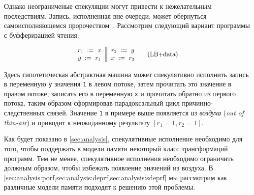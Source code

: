 Однако неограниченые спекуляции могут привести 
к нежелательным последствиям. 
Запись, исполненная вне очереди, может обернуться
самоисполняющемся пророчеством~\cite{Boehm-Demsky:MSPC14}. 
Рассмотрим следующий вариант программы с буфферизацией чтения:

\begin{equation*}
\small
\inarrII{
  \readInst{}{r_1}{x}   \\
  \writeInst{}{y}{r_1}  \\
}{
  \readInst{}{r_2}{y}   \\
  \writeInst{}{x}{r_2}  \\
}
\tag{LB+data}\label{ex:lb+data}
\end{equation*}

Здесь гипотетическая абстрактная машина 
может спекулятивно исполнить запись в переменную \texttt{y}
значения \texttt{1} в левом потоке, 
затем прочитать это значение в правом потоке, 
записать его в переменную \texttt{x} и прочитать обратно из 
первого потока, таким образом сформировав парадоксальный цикл 
причинно-следственных связей.  
Значение \texttt{1} в примере выше появляется \emph{из воздуха}
(\emph{out of thin-air}) и приводит 
к неожиданному результату ${[r_1=1, r_2=1]}$.

Как будет показано в \cref{sec:analysis},
спекулятивные исполнение необходимо для того, чтобы 
поддержать в модели памяти некоторый класс трансформаций программ. 
Тем не менее, спекулятивное исполнения необходимо 
ограничить должным образом, чтобы избежать 
появление значений из воздуха. 
В \cref{sec:analysis:porf,sec:analysis:deprf,sec:analysis:sdeprf}
мы рассмотрим как различные модели памяти подходят 
к решению этой проблемы. 
